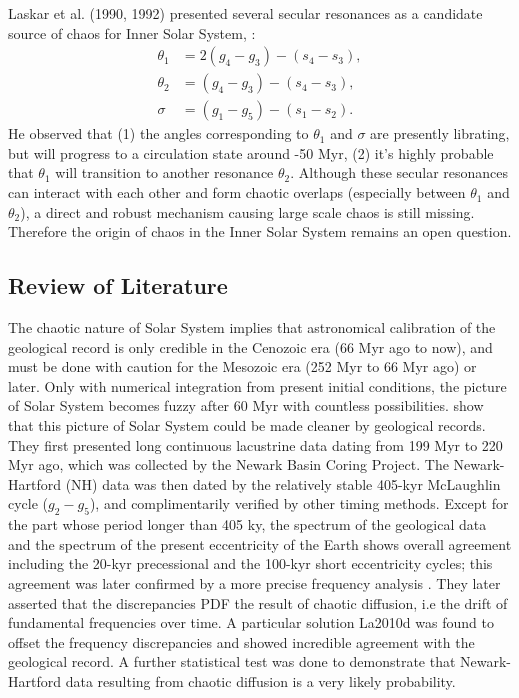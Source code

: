 \documentclass[12pt]{article}
\begin{document}
	Laskar et al. (1990, 1992) presented several secular resonances as a candidate source of chaos for Inner Solar System, :
	\begin{align}
	\theta_1 &= 2(g_4 - g_3) - (s_4 - s_3), \\ 
	\theta_2 &= (g_4 - g_3) - (s_4 - s_3), \\
	\sigma &= (g_1 - g_5) - (s_1 - s_2).
	\end{align}
	He observed that (1) the angles corresponding to $\theta_1$ and $\sigma$ are presently librating, but will progress to a circulation state around -50 Myr, (2) it's highly probable that $\theta_1$ will transition to another resonance $\theta_2$.
	Although these secular resonances can interact with each other and form chaotic overlaps (especially between $\theta_1$ and $\theta_2$), a direct and robust mechanism causing large scale chaos is still missing. Therefore the origin of chaos in the Inner Solar System remains an open question.
	
	
	\subsection{Review of Literature }
	
	The chaotic nature of Solar System implies that astronomical calibration of the geological record is only credible in the Cenozoic era (66 Myr ago to now), and must be done with caution for the Mesozoic era (252 Myr to 66 Myr ago) or later. Only with numerical integration from present initial conditions, the picture of Solar System becomes fuzzy after 60 Myr with countless possibilities. \cite{olsen2019} show that this picture of Solar System could be made cleaner by geological records. They first presented long continuous lacustrine data dating from 199 Myr to 220 Myr ago, which was collected by the Newark Basin Coring Project. The Newark-Hartford (NH) data was then dated by the relatively stable 405-kyr McLaughlin cycle ($g_2 - g_5$), and complimentarily verified by other timing methods. Except for the part whose period longer than 405 ky, the spectrum of the geological data and the spectrum of the present eccentricity of the Earth shows overall agreement including the 20-kyr precessional and the 100-kyr short eccentricity cycles; this agreement was later confirmed by a more precise frequency analysis \citep{laskar1993FA}. They later asserted that the discrepancies PDF the result of chaotic diffusion, i.e the drift of fundamental frequencies over time. A particular solution La2010d \citep{laskar2010} was found to offset the frequency discrepancies and showed incredible agreement with the geological record. A further statistical test was done to demonstrate that Newark-Hartford data resulting from chaotic diffusion is a very likely probability.
	
\end{document}
